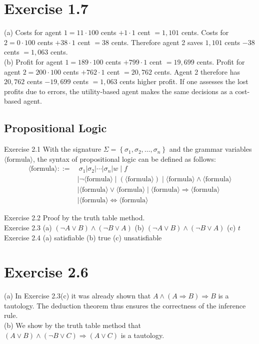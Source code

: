 \documentclass[10pt]{book}
\begin{document}
\section{Exercise 1.7}
(a) Costs for agent $1=11 \cdot 100$ cents $+1 \cdot 1$ cent $=1{,}101$ cents. Costs for $2=0 \cdot 100$ cents $+38 \cdot 1$ cent $=38$ cents. Therefore agent 2 saves $1{,}101$ cents $-38$ cents $=1{,}063$ cents.\\
(b) Profit for agent $1=189 \cdot 100$ cents $+799 \cdot 1$ cent $=19{,}699$ cents. Profit for agent $2=200 \cdot 100$ cents $+762 \cdot 1$ cent $=20{,}762$ cents. Agent 2 therefore has $20{,}762$ cents $-19{,}699$ cents $=1{,}063$ cents higher profit. If one assesses the lost profits due to errors, the utility-based agent makes the same decisions as a cost-based agent.

\subsection{Propositional Logic}
Exercise 2.1 With the signature $\Sigma=\left\{\sigma_{1}, \sigma_{2}, \ldots, \sigma_{n}\right\}$ and the grammar variables $\langle\text{formula}\rangle$, the syntax of propositional logic can be defined as follows:
$$
\begin{aligned}
\langle\text{formula}\rangle::= & \ \sigma_{1}\left|\sigma_{2}\right|\cdots\left|\sigma_{n}\right| w \mid f \\
& \mid \neg\langle\text{formula}\rangle \mid (\langle\text{formula}\rangle) \mid \langle\text{formula}\rangle \wedge \langle\text{formula}\rangle \\
& \mid \langle\text{formula}\rangle \vee \langle\text{formula}\rangle \mid \langle\text{formula}\rangle \Rightarrow \langle\text{formula}\rangle \\
& \mid \langle\text{formula}\rangle \Leftrightarrow \langle\text{formula}\rangle
\end{aligned}
$$

Exercise 2.2 Proof by the truth table method.\\
Exercise 2.3 (a) $(\neg A \vee B) \wedge (\neg B \vee A)$ \quad (b) $(\neg A \vee B) \wedge (\neg B \vee A)$ \quad (c) $t$\\
Exercise 2.4 (a) satisfiable \quad (b) true \quad (c) unsatisfiable

\section{Exercise 2.6}
(a) In Exercise 2.3(c) it was already shown that $A \wedge (A \Rightarrow B) \Rightarrow B$ is a tautology. The deduction theorem thus ensures the correctness of the inference rule.\\
(b) We show by the truth table method that $(A \vee B) \wedge (\neg B \vee C) \Rightarrow (A \vee C)$ is a tautology.
\end{document}
